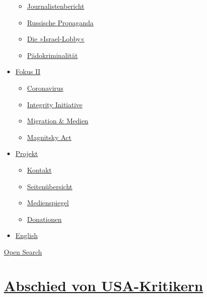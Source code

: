 \begin{itemize}
  \begin{itemize}
  \tightlist
  \item
    \href{https://swprs.org/bericht-eines-journalisten/}{Journalistenbericht}
  \item
    \href{https://swprs.org/russische-propaganda/}{Russische Propaganda}
  \item
    \href{https://swprs.org/die-israel-lobby-fakten-und-mythen/}{Die
    »Israel-Lobby«}
  \item
    \href{https://swprs.org/geopolitik-und-paedokriminalitaet/}{Pädokriminalität}
  \end{itemize}
\item
  \href{https://swprs.org/migration-und-medien/}{Fokus II}

  \begin{itemize}
  \tightlist
  \item
    \href{https://swprs.org/covid-19-hinweis-ii/}{Coronavirus}
  \item
    \href{https://swprs.org/die-integrity-initiative/}{Integrity
    Initiative}
  \item
    \href{https://swprs.org/migration-und-medien/}{Migration \& Medien}
  \item
    \href{https://swprs.org/der-fall-magnitsky/}{Magnitsky Act}
  \end{itemize}
\item
  \href{https://swprs.org/kontakt/}{Projekt}

  \begin{itemize}
  \tightlist
  \item
    \href{https://swprs.org/kontakt/}{Kontakt}
  \item
    \href{https://swprs.org/uebersicht/}{Seitenübersicht}
  \item
    \href{https://swprs.org/medienspiegel/}{Medienspiegel}
  \item
    \href{https://swprs.org/donationen/}{Donationen}
  \end{itemize}
\item
  \href{https://swprs.org/contact/}{English}
\end{itemize}

\protect\hyperlink{}{Open Search}

\hypertarget{abschied-von-usa-kritikern}{%
\section{\texorpdfstring{\href{https://swprs.org/2017/03/01/abschied-von-usa-kritikern/}{Abschied
von
USA-Kritikern}}{Abschied von USA-Kritikern}}\label{abschied-von-usa-kritikern}}

